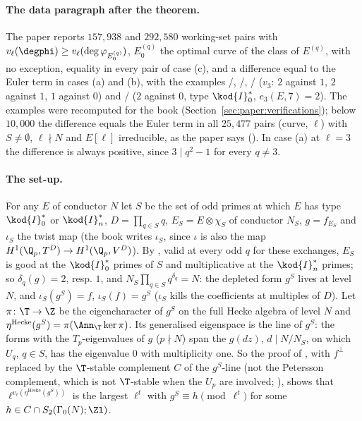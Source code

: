 \begin{sloppypar}
\paragraph{The data paragraph after the theorem.} The paper reports $157{,}938$ and $292{,}580$ working-set pairs with $v_\ell(\degphi)\ge v_\ell(\deg\varphi_{E^{(q)}_0})$, $E^{(q)}_0$ the optimal
curve of the class of $E^{(q)}$, with no exception, equality in every pair of case (c), and a difference equal to the Euler term in cases (a) and (b), with the examples
/, /, / ($v_3$: $2$ against $1$, $2$ against $1$, $1$ against $0$) and / ($2$ against $0$, type
$\kod{I}_0^*$, $e_3(E,7)=2$). The examples were recomputed for the book (Section~\ref{sec:paper:verifications}); below $10{,}000$ the difference equals the Euler term in all $25{,}477$ pairs
(curve, $\ell$) with $S\ne\emptyset$, $\ell\nmid N$ and $E[\ell]$ irreducible, as the paper says (). In case (a) at $\ell=3$ the difference is always positive,
since $3\mid q^2-1$ for every $q\ne3$.

\paragraph{The set-up.} For any $E$ of conductor $N$ let $S$ be the set of odd primes at which $E$ has type $\kod{I}_0^*$ or $\kod{I}_n^*$, $D=\prod_{q\in S}q$, $E_S=E\otimes\chi_S$ of
conductor $N_S$, $g=f_{E_S}$ and $\iota_S$ the twist map (the book writes $\iota_S$, since $\iota$ is also the map $H^1(\Q_p,T^D)\to H^1(\Q_p,V^D)$). By , valid at
every odd $q$ for these exchanges, $E_S$ is good at the $\kod{I}_0^*$ primes of $S$ and multiplicative at the $\kod{I}_n^*$ primes; so $\delta_q(g)=2$, resp. $1$, and
$N_S\prod_{q\in S}q^{\delta_q}=N$: the depleted form $g^S$ lives at level $N$, and $\iota_S(g^S)=f$, $\iota_S(f)=g^S$ ($\iota_S$ kills the coefficients at multiples of $D$). Let $\pi\colon\T\to\Z$ be
the eigencharacter of $g^S$ on the full Hecke algebra of level $N$ and $\eta^{\mathrm{Hecke}}(g^S)=\pi(\Ann_\T\ker\pi)$. Its generalised eigenspace is the line of $g^S$: the forms
with the $T_p$-eigenvalues of $g$ ($p\nmid N$) span the $g(dz)$, $d\mid N/N_S$, on which $U_q$, $q\in S$, has the eigenvalue $0$ with multiplicity one. So the proof of , with
$f^\perp$ replaced by the $\T$-stable complement $C$ of the $g^S$-line (not the Petersson complement, which is not $\T$-stable when the $U_p$ are involved; ), shows that
$\ell^{v_\ell(\eta^{\mathrm{Hecke}}(g^S))}$ is the largest $\ell^t$ with $g^S\equiv h\pmod{\ell^t}$ for some $h\in C\cap S_2(\Gamma_0(N);\Zl)$.


\end{sloppypar}
